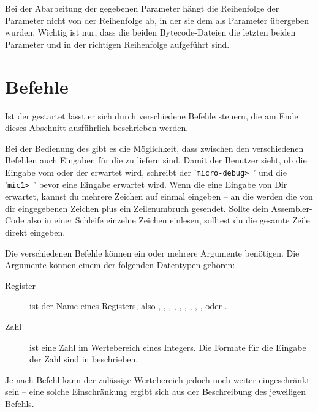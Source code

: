 Bei der Abarbeitung der gegebenen Parameter hängt die Reihenfolge der Parameter nicht von der Reihenfolge ab, in der sie dem \md{} als Parameter übergeben wurden. Wichtig ist nur, dass die beiden Bytecode-Dateien die letzten beiden Parameter und in der richtigen Reihenfolge aufgeführt sind.

\section{Befehle}
Ist der \md{} gestartet lässt er sich durch verschiedene Befehle steuern, die am Ende dieses Abschnitt ausführlich beschrieben werden.

Bei der Bedienung des \md{} gibt es die Möglichkeit, dass zwischen den verschiedenen Befehlen auch Eingaben für die \mic{} zu liefern sind. Damit der Benutzer sieht, ob die Eingabe vom \md{} oder der \mic{} erwartet wird, schreibt der \md{} '\texttt{micro-debug> }' und die \mic{} '\texttt{mic1> }' bevor eine Eingabe erwartet wird. Wenn die \mic{} eine Eingabe von Dir erwartet, kannst du mehrere Zeichen auf einmal eingeben -- an die \mic{} werden die von dir eingegebenen Zeichen plus ein Zeilenumbruch gesendet. Sollte dein Assembler-Code also in einer Schleife einzelne Zeichen einlesen, solltest du die gesamte Zeile direkt eingeben.

Die verschiedenen Befehle können ein oder mehrere Argumente benötigen. Die Argumente können einem der folgenden Datentypen gehören:
\begin{description}
\item[Register] ist der Name eines Registers, also , , , , , , , , ,  oder .
\item[Zahl] ist eine Zahl im Wertebereich eines Integers. Die Formate für die Eingabe der Zahl sind in  beschrieben.
\end{description}

Je nach Befehl kann der zulässige Wertebereich jedoch noch weiter eingeschränkt sein -- eine solche Einschränkung ergibt sich aus der Beschreibung des jeweiligen Befehls.

